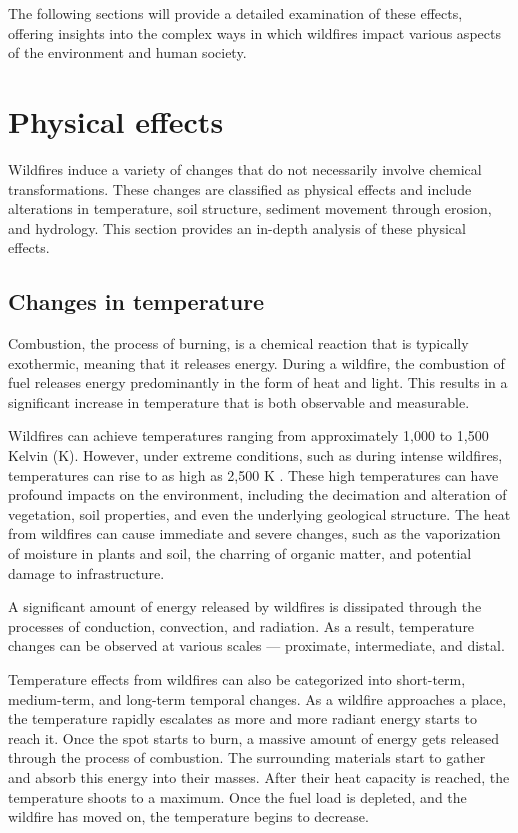 \documentclass[
  12 pt,
]{Nemilov}
\begin{document}
The following sections will provide a detailed examination of these effects, offering insights into the complex ways in which wildfires impact various aspects of the environment and human society.

\section{Physical effects}\label{physical-effects}

Wildfires induce a variety of changes that do not necessarily involve chemical transformations. These changes are classified as physical effects and include alterations in temperature, soil structure, sediment movement through erosion, and hydrology. This section provides an in-depth analysis of these physical effects.

\subsection{Changes in temperature}\label{changes-in-temperature}

Combustion, the process of burning, is a chemical reaction that is typically exothermic, meaning that it releases energy. During a wildfire, the combustion of fuel releases energy predominantly in the form of heat and light. This results in a significant increase in temperature that is both observable and measurable.

Wildfires can achieve temperatures ranging from approximately 1,000 to 1,500 Kelvin (K). However, under extreme conditions, such as during intense wildfires, temperatures can rise to as high as 2,500 K \citep{dennison2006wildfire}. These high temperatures can have profound impacts on the environment, including the decimation and alteration of vegetation, soil properties, and even the underlying geological structure. The heat from wildfires can cause immediate and severe changes, such as the vaporization of moisture in plants and soil, the charring of organic matter, and potential damage to infrastructure.

A significant amount of energy released by wildfires is dissipated through the processes of conduction, convection, and radiation. As a result, temperature changes can be observed at various scales --- proximate, intermediate, and distal.

Temperature effects from wildfires can also be categorized into short-term, medium-term, and long-term temporal changes. As a wildfire approaches a place, the temperature rapidly escalates as more and more radiant energy starts to reach it. Once the spot starts to burn, a massive amount of energy gets released through the process of combustion. The surrounding materials start to gather and absorb this energy into their masses. After their heat capacity is reached, the temperature shoots to a maximum. Once the fuel load is depleted, and the wildfire has moved on, the temperature begins to decrease.
\end{document}
